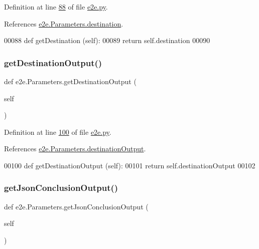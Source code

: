 Definition at line \hyperlink{e2e_8py_source_l00088}{88} of file \hyperlink{e2e_8py_source}{e2e.\+py}.



References \hyperlink{e2e_8py_source_l00034}{e2e.\+Parameters.\+destination}.


\begin{DoxyCode}
00088     \textcolor{keyword}{def }getDestination (self):
00089         \textcolor{keywordflow}{return} self.destination
00090 
\end{DoxyCode}
\mbox{\label{classe2e_1_1_parameters_a4451a6d8224c2216fdef8e53e55fadaf}} 
\subsubsection{\texorpdfstring{get\+Destination\+Output()}{getDestinationOutput()}}
{\footnotesize\ttfamily def e2e.\+Parameters.\+get\+Destination\+Output (\begin{DoxyParamCaption}\item[{}]{self }\end{DoxyParamCaption})}



Definition at line \hyperlink{e2e_8py_source_l00100}{100} of file \hyperlink{e2e_8py_source}{e2e.\+py}.



References \hyperlink{e2e_8py_source_l00036}{e2e.\+Parameters.\+destination\+Output}.


\begin{DoxyCode}
00100     \textcolor{keyword}{def }getDestinationOutput (self):
00101         \textcolor{keywordflow}{return} self.destinationOutput
00102         
\end{DoxyCode}
\mbox{\label{classe2e_1_1_parameters_ae343f8409c393d17d08a8626efea6572}} 
\subsubsection{\texorpdfstring{get\+Json\+Conclusion\+Output()}{getJsonConclusionOutput()}}
{\footnotesize\ttfamily def e2e.\+Parameters.\+get\+Json\+Conclusion\+Output (\begin{DoxyParamCaption}\item[{}]{self }\end{DoxyParamCaption})}



